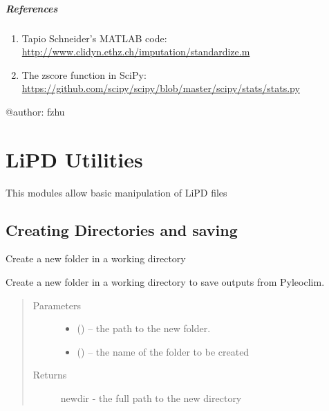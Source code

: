\documentclass[letterpaper,10pt,english]{sphinxmanual}
\begin{document}
\begin{fulllineitems}
\paragraph{References}
\begin{enumerate}
\item {} 
Tapio Schneider's MATLAB code: \url{http://www.clidyn.ethz.ch/imputation/standardize.m}

\item {} 
The zscore function in SciPy: \url{https://github.com/scipy/scipy/blob/master/scipy/stats/stats.py}

\end{enumerate}

@author: fzhu

\end{fulllineitems}



\chapter{LiPD Utilities}
\label{\detokenize{LipdUtils:lipd-utilities}}\label{\detokenize{LipdUtils::doc}}
This modules allow basic manipulation of LiPD files


\section{Creating Directories and saving}
\label{\detokenize{LipdUtils:creating-directories-and-saving}}

\begin{fulllineitems}
\label{\detokenize{LipdUtils:pyleoclim.LipdUtils.createDir}}
Create a new folder in a working directory

Create a new folder in a working directory to save outputs from Pyleoclim.
\begin{quote}\begin{description}
\item[{Parameters}] \leavevmode\begin{itemize}
\item {} 
 () -- the path to the new folder.

\item {} 
 () -- the name of the folder to be created

\end{itemize}

\item[{Returns}] \leavevmode
newdir - the full path to the new directory

\end{description}\end{quote}

\end{fulllineitems}
\end{document}
